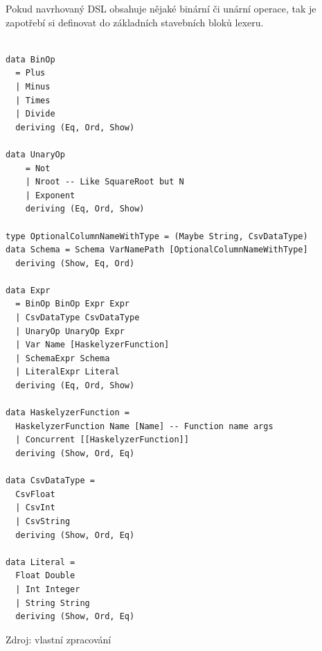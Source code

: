 \documentclass[male, czech]{kithesis}
\newenvironment{code}{\captionsetup{type=listing}}{}
\begin{document}
Pokud navrhovaný DSL obsahuje nějaké binární či unární operace, 
tak je zapotřebí si definovat do základních stavebních bloků lexeru.

\begin{code}
\begin{verbatim}

data BinOp
  = Plus
  | Minus
  | Times
  | Divide
  deriving (Eq, Ord, Show)

data UnaryOp
    = Not
    | Nroot -- Like SquareRoot but N 
    | Exponent
    deriving (Eq, Ord, Show)

type OptionalColumnNameWithType = (Maybe String, CsvDataType)
data Schema = Schema VarNamePath [OptionalColumnNameWithType] 
  deriving (Show, Eq, Ord)

data Expr
  = BinOp BinOp Expr Expr
  | CsvDataType CsvDataType 
  | UnaryOp UnaryOp Expr 
  | Var Name [HaskelyzerFunction]
  | SchemaExpr Schema 
  | LiteralExpr Literal
  deriving (Eq, Ord, Show)

data HaskelyzerFunction = 
  HaskelyzerFunction Name [Name] -- Function name args
  | Concurrent [[HaskelyzerFunction]]
  deriving (Show, Ord, Eq)

data CsvDataType = 
  CsvFloat 
  | CsvInt 
  | CsvString 
  deriving (Show, Ord, Eq)

data Literal = 
  Float Double 
  | Int Integer
  | String String
  deriving (Show, Ord, Eq)

\end{verbatim}
\end{code}

\newpage

{
\begin{center}
Zdroj: vlastní zpracování
\end{center}
}
\end{document}
